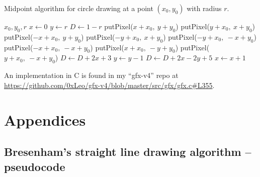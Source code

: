 \documentclass[a4paper]{article}
\begin{document}
\begin{algorithm}[H]
\caption{Midpoint algorithm for circle drawing at a point $(x_0,y_0)$ with radius $r$.}
\begin{algorithmic}[1]
 {$x_0,y_0,r$}
\State $x \leftarrow 0$
\State $y \leftarrow r$
\State $D \leftarrow 1 - r$ 
\Do
    \State putPixel($x + x_0,\ y + y_0$)    
    \State putPixel($y + x_0,\ x + y_0$)    
    \State putPixel($-x + x_0,\ y + y_0$)    
    \State putPixel($-y + x_0,\ x + y_0$)    
    \State putPixel($-y + x_0,\ -x + y_0$)    
    \State putPixel($-x + x_0,\ -x + y_0$)    
    \State putPixel($x + x_0,\ -y + y_0$)    
    \State putPixel($y + x_0,\ -x + y_0$)    
        \State $D\leftarrow D + 2x + 3$
    \Else
        \State $y\leftarrow y - 1$
        \State $D \leftarrow D + 2x - 2y + 5$
    \EndIf  
    \State $x \leftarrow x + 1$
\EndProcedure
\end{algorithmic}
\end{algorithm}
An implementation in C is found in my ``gfx-v4'' repo at \url{https://github.com/0xLeo/gfx-v4/blob/master/src/gfx/gfx.c#L355}.

\newpage
\printbibliography



\newpage
\appendix

\section{Appendices}


\subsection{Bresenham's straight line drawing algorithm -- pseudocode}
\label{app:bresenham_full_pseudo}
\end{document}
